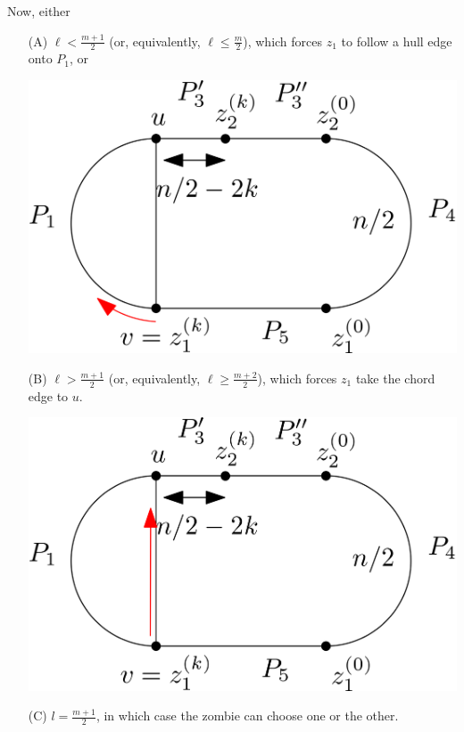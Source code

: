 \documentclass[letterpaper, 10pt]{article}
\begin{document}
\begin{enumerate}
       Now, either
       \begin{enumerate}
        \item[(A)] $\ell < \frac{m+1}{2}$ (or, equivalently, $\ell \leq \frac{m}{2}$),
              which forces $z_1$ to follow a hull edge onto $P_1$, or
              \begin{center}
               \includegraphics[scale=0.15]{diagram6}
              \end{center}
        \item[(B)] $\ell > \frac{m+1}{2}$ (or, equivalently, $\ell \geq \frac{m+2}{2}$),
              which forces $z_1$ take the chord edge to $u$.
              \begin{center}
               \includegraphics[scale=0.15]{diagram7}
              \end{center}
        \item[(C)] $l = \frac{m+1}{2}$, in which case the zombie can choose one or the other.
       \end{enumerate}


\end{enumerate}
\end{document}
